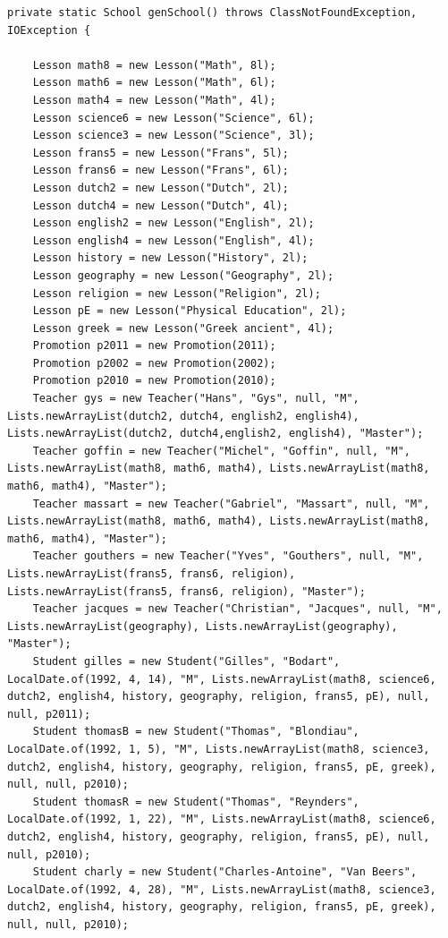 \documentclass[a4paper,fleqn,12pt]{report}
\begin{document}
\begin{lstlisting}
private static School genSchool() throws ClassNotFoundException, IOException {

    Lesson math8 = new Lesson("Math", 8l);
    Lesson math6 = new Lesson("Math", 6l);
    Lesson math4 = new Lesson("Math", 4l);
    Lesson science6 = new Lesson("Science", 6l);
    Lesson science3 = new Lesson("Science", 3l);
    Lesson frans5 = new Lesson("Frans", 5l);
    Lesson frans6 = new Lesson("Frans", 6l);
    Lesson dutch2 = new Lesson("Dutch", 2l);
    Lesson dutch4 = new Lesson("Dutch", 4l);
    Lesson english2 = new Lesson("English", 2l);
    Lesson english4 = new Lesson("English", 4l);
    Lesson history = new Lesson("History", 2l);
    Lesson geography = new Lesson("Geography", 2l);
    Lesson religion = new Lesson("Religion", 2l);
    Lesson pE = new Lesson("Physical Education", 2l);
    Lesson greek = new Lesson("Greek ancient", 4l);
    Promotion p2011 = new Promotion(2011);
    Promotion p2002 = new Promotion(2002);
    Promotion p2010 = new Promotion(2010);
    Teacher gys = new Teacher("Hans", "Gys", null, "M", Lists.newArrayList(dutch2, dutch4, english2, english4), Lists.newArrayList(dutch2, dutch4,english2, english4), "Master");
    Teacher goffin = new Teacher("Michel", "Goffin", null, "M", Lists.newArrayList(math8, math6, math4), Lists.newArrayList(math8, math6, math4), "Master");
    Teacher massart = new Teacher("Gabriel", "Massart", null, "M", Lists.newArrayList(math8, math6, math4), Lists.newArrayList(math8, math6, math4), "Master");
    Teacher gouthers = new Teacher("Yves", "Gouthers", null, "M", Lists.newArrayList(frans5, frans6, religion), Lists.newArrayList(frans5, frans6, religion), "Master");
    Teacher jacques = new Teacher("Christian", "Jacques", null, "M", Lists.newArrayList(geography), Lists.newArrayList(geography), "Master");
    Student gilles = new Student("Gilles", "Bodart", LocalDate.of(1992, 4, 14), "M", Lists.newArrayList(math8, science6, dutch2, english4, history, geography, religion, frans5, pE), null, null, p2011);
    Student thomasB = new Student("Thomas", "Blondiau", LocalDate.of(1992, 1, 5), "M", Lists.newArrayList(math8, science3, dutch2, english4, history, geography, religion, frans5, pE, greek), null, null, p2010);
    Student thomasR = new Student("Thomas", "Reynders", LocalDate.of(1992, 1, 22), "M", Lists.newArrayList(math8, science6, dutch2, english4, history, geography, religion, frans5, pE), null, null, p2010);
    Student charly = new Student("Charles-Antoine", "Van Beers", LocalDate.of(1992, 4, 28), "M", Lists.newArrayList(math8, science3, dutch2, english4, history, geography, religion, frans5, pE, greek), null, null, p2010);

\end{lstlisting}
\end{document}

